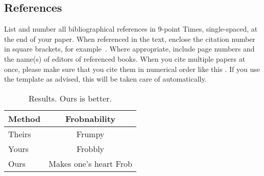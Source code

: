 \documentclass[10pt,twocolumn,letterpaper]{article}
\begin{document}
\subsection{References}

List and number all bibliographical references in 9-point Times, single-spaced, at the end of your paper.
When referenced in the text, enclose the citation number in square brackets, for
example~\cite{Authors14}.
Where appropriate, include page numbers and the name(s) of editors of referenced books.
When you cite multiple papers at once, please make sure that you cite them in numerical order like this \cite{Alpher02,Alpher03,Alpher05,Authors14b,Authors14}.
If you use the template as advised, this will be taken care of automatically.

\begin{table}
  \centering
  \begin{tabular}{@{}lc@{}}
    \toprule
    Method & Frobnability \\
    \midrule
    Theirs & Frumpy \\
    Yours & Frobbly \\
    Ours & Makes one's heart Frob\\
    \bottomrule
  \end{tabular}
  \caption{Results.   Ours is better.}
  \label{tab:example}
\end{table}
\end{document}
